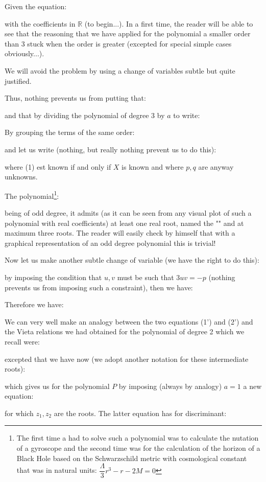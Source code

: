 	Given the equation:
	
	with the coefficients in $\mathbb{R}$ (to begin...). In a first time, the reader will be able to see that the reasoning that we have applied for the polynomial a smaller order than $3$ stuck when the order is greater (excepted for special simple cases obviously...).

	We will avoid the problem by using a change of variables subtle but quite justified.
	
	Thus, nothing prevents us from putting that:
	
	and that by dividing the polynomial of degree 3 by $a$ to write:
	
	By grouping the terms of the same order:
	
	and let us write (nothing, but really nothing prevent us to do this):
	
	where (1) est known if and only if $X$ is known and where $p,q$ are anyway unknowns.

	The polynomial\footnote{The first time a had to solve such a polynomial was to calculate the nutation of a gyroscope and the second time was for the calculation of the horizon of a Black Hole based on the Schwarzschild metric with cosmological constant that was in natural units: $\dfrac{\Lambda}{3}r^3-r-2M=0$}:
	
	being of odd degree, it admits (as it can be seen from any visual plot of such a polynomial with real coefficients) at least one real root, named the "" and at maximum three roots. The reader will easily check by himself that with a graphical representation of an odd degree polynomial this is trivial!
	
	Now let us make another subtle change of variable (we have the right to do this):
	
	by imposing the condition that $u, v$ must be such that $3uv=-p$ (nothing prevents us from imposing such a constraint), then we have:
	
	Therefore we have:
	
	We can very well make an analogy between the two equations (1') and (2') and the Vieta relations we had obtained for the polynomial of degree 2 which we recall were:
	
	excepted that we have now (we adopt another notation for these intermediate roots):
	
	which gives us for the polynomial $P$ by imposing (always by analogy) $a=1$ a new equation:
	
	for which $z_1,z_2$ are the roots.
	The latter equation has for discriminant:
	
